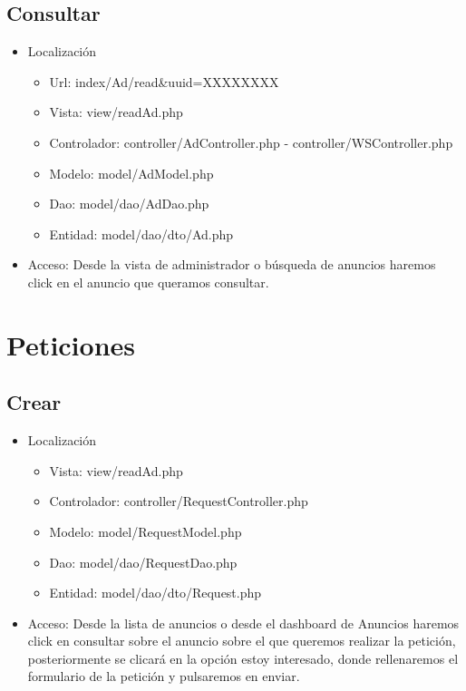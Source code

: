 \subsection{Consultar}
\begin{itemize}
\item Localizaci\'{o}n
\begin{itemize}
\item Url: index/Ad/read\&uuid=XXXXXXXX
\item Vista: view/readAd.php
\item Controlador: controller/AdController.php - controller/WSController.php 
\item Modelo: model/AdModel.php
\item Dao: model/dao/AdDao.php
\item Entidad: model/dao/dto/Ad.php
\end{itemize}
\item Acceso: Desde la vista de administrador o b\'{u}squeda de anuncios haremos click en el anuncio que queramos consultar.
\end{itemize}

\section{Peticiones}
\subsection{Crear}
\begin{itemize}
\item Localizaci\'{o}n
\begin{itemize}
\item Vista: view/readAd.php
\item Controlador: controller/RequestController.php
\item Modelo: model/RequestModel.php
\item Dao: model/dao/RequestDao.php
\item Entidad: model/dao/dto/Request.php
\end{itemize}
\item Acceso: Desde la lista de anuncios o desde el dashboard de Anuncios haremos click en consultar sobre el anuncio sobre el que queremos realizar la petici\'{o}n, posteriormente se clicar\'{a} en la opci\'{o}n estoy interesado, donde rellenaremos el formulario de la petici\'{o}n y pulsaremos en enviar.
\end{itemize}

